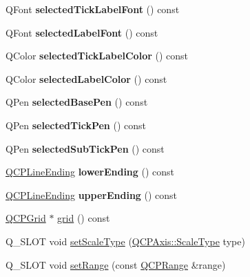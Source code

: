 \begin{DoxyCompactItemize}
\mbox{\label{classQCPAxis_a09817512bef8ddfb669a6828f9c855bc}} 
Q\+Font {\bfseries selected\+Tick\+Label\+Font} () const
\item 
\mbox{\label{classQCPAxis_a1399d614f7c307159bfec938a069203d}} 
Q\+Font {\bfseries selected\+Label\+Font} () const
\item 
\mbox{\label{classQCPAxis_a75f11d3031a11559f3e984e916fcde2c}} 
Q\+Color {\bfseries selected\+Tick\+Label\+Color} () const
\item 
\mbox{\label{classQCPAxis_a7adea64ef4b715e7a1c519fff2b110b8}} 
Q\+Color {\bfseries selected\+Label\+Color} () const
\item 
\mbox{\label{classQCPAxis_a0d54314ab3053fd0fb77294a0e7f08cb}} 
Q\+Pen {\bfseries selected\+Base\+Pen} () const
\item 
\mbox{\label{classQCPAxis_a76b52a6d824ccf9a95eb024251e1b833}} 
Q\+Pen {\bfseries selected\+Tick\+Pen} () const
\item 
\mbox{\label{classQCPAxis_a73c147bb2c5598edbb842adc2da8a7bf}} 
Q\+Pen {\bfseries selected\+Sub\+Tick\+Pen} () const
\item 
\mbox{\label{classQCPAxis_a0cc60e5694ed4df6a2c3554e53ee6ae7}} 
\hyperlink{classQCPLineEnding}{Q\+C\+P\+Line\+Ending} {\bfseries lower\+Ending} () const
\item 
\mbox{\label{classQCPAxis_a9feaf5f78286693e89221bc205f9389a}} 
\hyperlink{classQCPLineEnding}{Q\+C\+P\+Line\+Ending} {\bfseries upper\+Ending} () const
\item 
\hyperlink{classQCPGrid}{Q\+C\+P\+Grid} $\ast$ \hyperlink{classQCPAxis_a63f1dd2df663680d2a8d06c19592dd63}{grid} () const
\item 
Q\+\_\+\+S\+L\+OT void \hyperlink{classQCPAxis_adef29cae617af4f519f6c40d1a866ca6}{set\+Scale\+Type} (\hyperlink{classQCPAxis_a36d8e8658dbaa179bf2aeb973db2d6f0}{Q\+C\+P\+Axis\+::\+Scale\+Type} type)
\item 
Q\+\_\+\+S\+L\+OT void \hyperlink{classQCPAxis_aebdfea5d44c3a0ad2b4700cd4d25b641}{set\+Range} (const \hyperlink{classQCPRange}{Q\+C\+P\+Range} \&range)

\end{DoxyCompactItemize}
